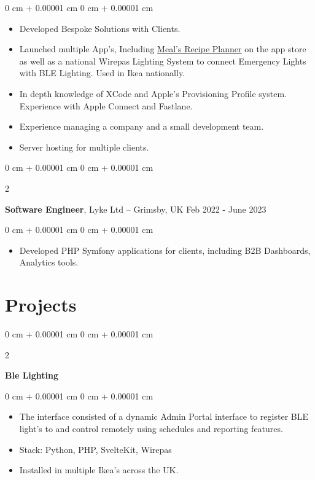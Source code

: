\documentclass[10pt, letterpaper]{article}
\newenvironment{highlights}{
    \begin{itemize}[
        topsep=0.10 cm,
        parsep=0.10 cm,
        partopsep=0pt,
        itemsep=0pt,
        leftmargin=0 cm + 10pt
    ]
}{
    \end{itemize}
} %
\newenvironment{onecolentry}{
    \begin{adjustwidth}{
        0 cm + 0.00001 cm
    }{
        0 cm + 0.00001 cm
    }
}{
    \end{adjustwidth}
} %
\newenvironment{twocolentry}[2][]{
    \onecolentry
    \def\secondColumn{#2}
    \setcolumnwidth{\fill, 4.5 cm}
    \begin{paracol}{2}
}{
    \switchcolumn \raggedleft \secondColumn
    \end{paracol}
    \endonecolentry
} %
\begin{document}
        \vspace{0.10 cm}
        \begin{onecolentry}
            \begin{highlights}
                \item Developed Bespoke Solutions with Clients.
                \item Launched multiple App's, Including \href{https://www.linkedin.com/company/mealsapp/}{Meal's Recipe Planner} on the app store as well as a national Wirepas Lighting System to connect Emergency Lights with BLE Lighting. Used in Ikea nationally.
                \item In depth knowledge of XCode and Apple's Provisioning Profile system. Experience with Apple Connect and Fastlane.
                \item Experience managing a company and a small development team.
                \item Server hosting for multiple clients.
            \end{highlights}
        \end{onecolentry}
        
        \begin{twocolentry}{
            Feb 2022 - June 2023
        }
            \textbf{Software Engineer}, Lyke Ltd -- Grimsby, UK\end{twocolentry}

        \vspace{0.10 cm}
        \begin{onecolentry}
            \begin{highlights}
                \item Developed PHP Symfony applications for clients, including B2B Dashboards, Analytics tools.
            \end{highlights}
        \end{onecolentry}

    
    \section{Projects}

        \begin{twocolentry}{}
            \textbf{Ble Lighting}\end{twocolentry}

        \vspace{0.10 cm}
        \begin{onecolentry}
            \begin{highlights}
                \item The interface consisted of a dynamic Admin Portal interface to register BLE light's to and control remotely using schedules and reporting features.
                \item Stack: Python, PHP, SvelteKit, Wirepas
                \item Installed in multiple Ikea's across the UK. 
            \end{highlights}
        \end{onecolentry}
\end{document}
